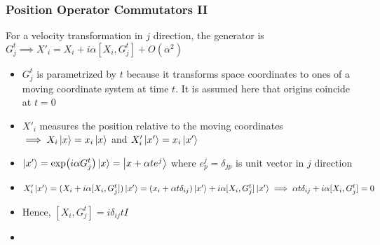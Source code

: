 \documentclass[8pt,t,mathserif,aspectratio=169]{beamer}
\begin{document}
\begin{frame}
  \frametitle{Position Operator Commutators II}
  \vspace{1mm}
  For a velocity transformation in $j$ direction, the generator is $G^t_j \implies X'_i = X_i + i \alpha [X_i,G^t_j] + O(\alpha^2)$
  \begin{itemize}
    \item $G^t_j$ is parametrized by $t$ because it transforms space coordinates to ones of a moving coordinate system at time $t$. It is assumed here that origins coincide at $t = 0$
    \item $X'_i$ measures the position relative to the moving coordinates $\implies X_i \ket{x} = x_i \ket{x}$ and $X'_i \ket{x'} = x_i \ket{x'}$
    \item $\ket{x'} = \exp(i \alpha G^t_j) \ket{x} = \ket{x + \alpha t e^j}$ where $e^j_p = \delta_{jp}$ is unit vector in $j$ direction
    \item $X'_i \ket{x'} = (X_i + i \alpha [X_i,G^t_j])\ket{x'} = (x_i + \alpha t \delta_{ij})\ket{x'} + i \alpha [X_i,G^t_j] \ket{x'} \implies \alpha t \delta_{ij} + i \alpha [X_i,G^t_j] = 0$
    \item Hence, $[X_i,G^t_j] = i \delta_{ij} t I$
    \item $$
  \end{itemize}
\end{frame}
\end{document}

